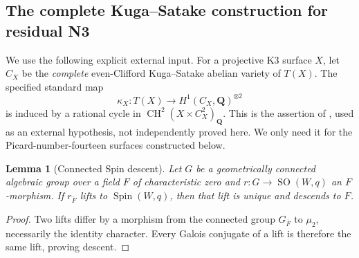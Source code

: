 \documentclass[11pt,reqno]{article}
\theoremstyle{emphasizedplain}
\newtheorem{lemma}[theorem]{Lemma}
\theoremstyle{emphasizeddefinition}
\theoremstyle{emphasizeddefinition}
\DeclareMathOperator{\SO}{SO}
\DeclareMathOperator{\CH}{CH}
\newcommand{\Q}{\mathbf Q}
\begin{document}
\subsection*{The complete Kuga--Satake construction for residual N3}
We use the following explicit external input. For a projective K3 surface
$X$, let $C_X$ be the \emph{complete} even-Clifford Kuga--Satake abelian
variety of $T(X)$. The specified standard map
\[
 \kappa_X:T(X)\longrightarrow H^1(C_X,\Q)^{\otimes2}
\]
is induced by a rational cycle in $\CH^2(X\times C_X^2)_\Q$.
This is the assertion of \cite[Theorem 1.1]{OpenAIKS}, used as an
external hypothesis, not independently proved here. We only need it for
the Picard-number-fourteen surfaces constructed below.

\begin{lemma}[Connected Spin descent]\label{p:N3spin-descent}
Let $G$ be a geometrically connected algebraic group over a field $F$
of characteristic zero and $r:G\to\SO(W,q)$ an $F$-morphism. If
$r_{\overline F}$ lifts to $\operatorname{Spin}(W,q)$, then that lift is
unique and descends to $F$.
\end{lemma}
\begin{proof}
Two lifts differ by a morphism from the connected group $G_{\overline F}$
to $\mu_2$, necessarily the identity character. Every Galois conjugate
of a lift is therefore the same lift, proving descent.
\end{proof}
\end{document}
